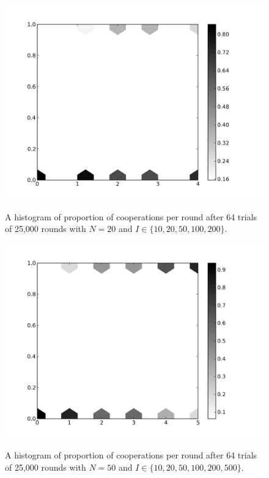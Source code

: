 \documentclass{amsart}
\begin{document}
\begin{figure}[h]
\caption{A histogram of proportion of cooperations per round after 64
  trials of 25,000 rounds with $N=20$ and $I \in
  \{10,20,50,100,200\}$.}

\includegraphics[width=\textwidth]{pop20iter.png}
\label{fig:pop20iter}
\end{figure}

\begin{figure}[h]
\caption{A histogram of proportion of cooperations per round after 64
  trials of 25,000 rounds with $N=50$ and $I \in
  \{10,20,50,100,200,500\}$.}

\includegraphics[width=\textwidth]{pop50iter.png}
\label{fig:pop50iter}
\end{figure}
\end{document}
